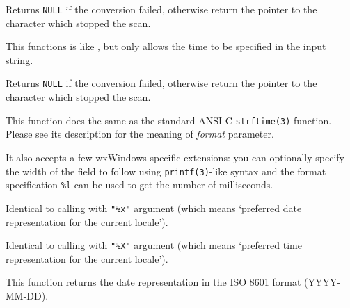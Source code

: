 Returns {\tt NULL} if the conversion failed, otherwise return the pointer to
the character which stopped the scan.

\label{wxdatetimeparsetime}


This functions is like , but
only allows the time to be specified in the input string.

Returns {\tt NULL} if the conversion failed, otherwise return the pointer to
the character which stopped the scan.

\label{wxdatetimeformat}


This function does the same as the standard ANSI C {\tt strftime(3)} function.
Please see its description for the meaning of {\it format} parameter.

It also accepts a few wxWindows-specific extensions: you can optionally specify
the width of the field to follow using {\tt printf(3)}-like syntax and the
format specification {\tt \%l} can be used to get the number of milliseconds.



\label{wxdatetimeformatdate}


Identical to calling  with {\tt "\%x"}
argument (which means `preferred date representation for the current locale').

\label{wxdatetimeformattime}


Identical to calling  with {\tt "\%X"}
argument (which means `preferred time representation for the current locale').

\label{wxdatetimeformatisodate}


This function returns the date representation in the ISO 8601 format
(YYYY-MM-DD).

